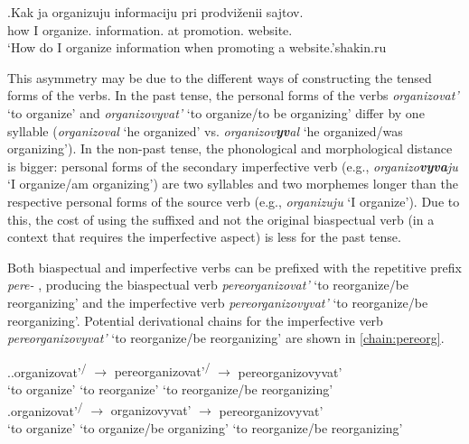 \exg.\label{ex:organizovat}Kak ja organizuju\textsuperscript{\IPF} informaciju pri prodvi\v{z}enii sajtov.\\
how I organize. information. at promotion. website.\\
\trans `How do I organize information when promoting a website.'\hbox{}\hfill\hbox{shakin.ru}

This asymmetry may be due to the different ways of constructing the tensed forms of the verbs. In the past  tense, the personal forms of the verbs \textit{organizovat'} `to organize' and \textit{organizovyvat'}\textsuperscript{\IPF} `to organize/to be organizing' differ by one syllable (\textit{organizoval} `he organized' vs. \textit{organizov\textbf{yv}al} `he organized/was organizing'). In the non-past   tense, the phonological and morphological distance is bigger: personal forms of the secondary imperfective  verb  (e.g., \textit{organizo\textbf{vyva}ju} `I organize/am organizing') are two syllables and two morphemes longer than the respective personal forms of the source verb (e.g., \textit{organizuju} `I organize'). Due to this, the cost of using the suffixed and not the original biaspectual verb  (in a context   that requires the imperfective aspect) is less for the past  tense.

Both biaspectual and imperfective verbs  can be prefixed with the repetitive  prefix \textit{pere-}  , producing the biaspectual verb  \textit{pereorganizovat'} `to reorganize/be reorganizing' and the imperfective verb  \textit{pereorganizovyvat'} `to reorganize/be reorganizing'. Potential derivational chains for the imperfective verb  \textit{pereorganizovyvat'} `to reorganize/be reorganizing' are shown in \ref{chain:pereorg}. 

\ex.\label{chain:pereorg}\ag.organizovat'\textsuperscript{\PF\slash\IPF} {$\rightarrow$} {pereorganizovat'\textsuperscript{\PF\slash\IPF}} {$\rightarrow$} pereorganizovyvat'\textsuperscript{\IPF}\\
{`to organize'} {} {`to reorganize'} {} {`to reorganize/be reorganizing'}\\
\bg.organizovat'\textsuperscript{\PF\slash\IPF} {$\rightarrow$} {organizovyvat'\textsuperscript{\IPF}} {$\rightarrow$} pereorganizovyvat'\textsuperscript{\IPF}\\
{`to organize'} {} {`to organize/be organizing'} {} {`to reorganize/be reorganizing'}\\


